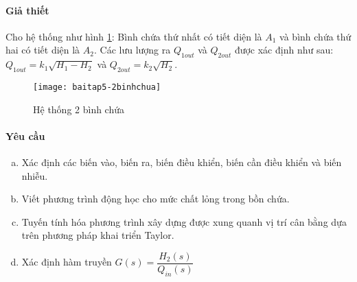 \paragraph{Giả thiết}
    Cho hệ thống như hình \ref{Fig:baitap5-2binhchua}: Bình chứa thứ nhất có tiết diện là $A_1$ và bình chứa thứ hai có tiết diện là $A_2$. Các lưu lượng ra $Q_{1out}$ và $Q_{2out}$ được xác định như sau: $Q_{1out} = k_1 \sqrt{H_1 - H_2}$ và $Q_{2out} = k_2 \sqrt{H_2}$.
    \begin{figure}[htp]
        \begin{center}
            \texttt{[image: baitap5-2binhchua]}
        \end{center}
        \caption{Hệ thống 2 bình chứa} \label{Fig:baitap5-2binhchua}
    \end{figure}

\paragraph{Yêu cầu}
    \begin{enumerate}[a.]
        \item Xác định các biến vào, biến ra, biến điều khiển, biến cần điều khiển và biến nhiễu.
        \item Viết phương trình động học cho mức chất lỏng trong bồn chứa.
        \item Tuyến tính hóa phương trình xây dựng được xung quanh vị trí cân bằng dựa trên phương pháp khai triển Taylor.
        \item Xác định hàm truyền $G(s) = \dfrac{H_2(s)}{Q_{in}(s)}$
    \end{enumerate}

